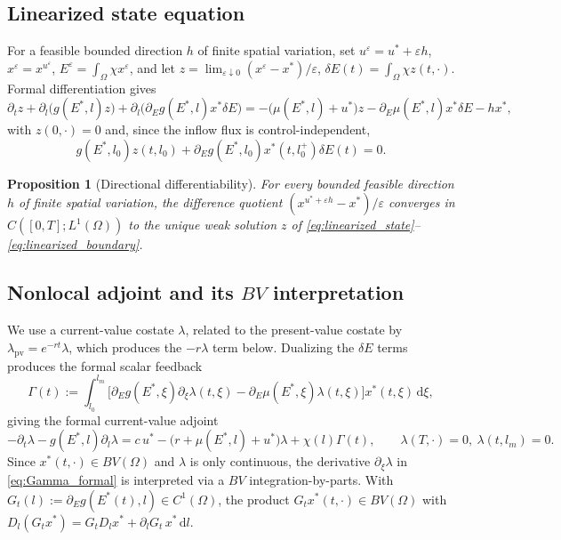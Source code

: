 \documentclass[pdflatex,sn-mathphys-num]{sn-jnl}
\newcommand{\Om}{\Omega}
\newcommand{\dd}{\,\mathrm{d}}
\theoremstyle{plain}
\newtheorem{proposition}[theorem]{Proposition}
\theoremstyle{definition}
\theoremstyle{remark}
\begin{document}
\subsection{Linearized state equation}
\label{subsec:linearized_state}

For a feasible bounded direction $h$ of finite spatial variation, set
$u^\varepsilon=u^*+\varepsilon h$, $x^\varepsilon=x^{u^\varepsilon}$,
$E^\varepsilon=\int_\Om\chi x^\varepsilon$, and let
$z=\lim_{\varepsilon\downarrow0}(x^\varepsilon-x^*)/\varepsilon$,
$\delta E(t)=\int_\Om\chi z(t,\cdot)$. Formal differentiation gives
\begin{equation}\label{eq:linearized_state}
\partial_t z+\partial_l\!\big(g(E^*,l)z\big)
+\partial_l\!\big(\partial_Eg(E^*,l)x^*\delta E\big)
=
-\big(\mu(E^*,l)+u^*\big)z-\partial_E\mu(E^*,l)x^*\delta E-hx^*,
\end{equation}
with $z(0,\cdot)=0$ and, since the inflow flux is control-independent,
\begin{equation}\label{eq:linearized_boundary}
g(E^*,l_0)z(t,l_0)+\partial_Eg(E^*,l_0)x^*(t,l_0^+)\delta E(t)=0.
\end{equation}

\begin{proposition}[Directional differentiability]
\label{prop:state_differentiability}
For every bounded feasible direction $h$ of finite spatial variation, the
difference quotient $(x^{u^*+\varepsilon h}-x^*)/\varepsilon$ converges in
$C([0,T];L^1(\Om))$ to the unique weak solution $z$ of
\eqref{eq:linearized_state}--\eqref{eq:linearized_boundary}.
\end{proposition}

\subsection{Nonlocal adjoint and its $BV$ interpretation}
\label{subsec:formal_adjoint}

We use a current-value costate $\lambda$, related to the present-value costate by
$\lambda_{\mathrm{pv}}=e^{-rt}\lambda$, which produces the $-r\lambda$ term below.
Dualizing the $\delta E$ terms produces the formal scalar feedback
\begin{equation}\label{eq:Gamma_formal}
\Gamma(t):=
\int_{l_0}^{l_m}
\big[\partial_Eg(E^*,\xi)\partial_\xi\lambda(t,\xi)
-\partial_E\mu(E^*,\xi)\lambda(t,\xi)\big]x^*(t,\xi)\dd\xi,
\end{equation}
giving the formal current-value adjoint
\[
-\partial_t\lambda-g(E^*,l)\partial_l\lambda
=
c\,u^*-\big(r+\mu(E^*,l)+u^*\big)\lambda+\chi(l)\Gamma(t),
\qquad
\lambda(T,\cdot)=0,\ \lambda(t,l_m)=0.
\]
Since $x^*(t,\cdot)\in BV(\Om)$ and $\lambda$ is only continuous, the derivative
$\partial_\xi\lambda$ in \eqref{eq:Gamma_formal} is interpreted via a $BV$
integration-by-parts. With $G_t(l):=\partial_Eg(E^*(t),l)\in C^1(\Om)$, the product
$G_tx^*(t,\cdot)\in BV(\Om)$ with $D_l(G_tx^*)=G_tD_lx^*+\partial_lG_t\,x^*\dd l$.
\end{document}
